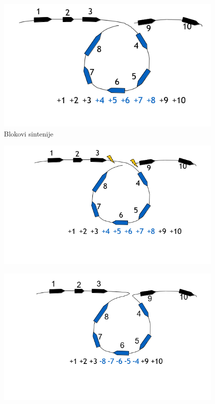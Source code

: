 \begin{figure}[h!]
\centering
\includegraphics[scale=0.5]{poglavlja/6/slike/promene1.PNG}
\caption{Blokovi sintenije}
\label{slika:X}
\end{figure}

\begin{figure}[h!]
\centering
\includegraphics[scale=0.5]{poglavlja/6/slike/promene2.PNG}
\caption{}
\label{slika:X}
\end{figure}

\begin{figure}[h!]
\centering
\includegraphics[scale=0.5]{poglavlja/6/slike/promene3.PNG}
\caption{}
\label{slika:X}
\end{figure}

